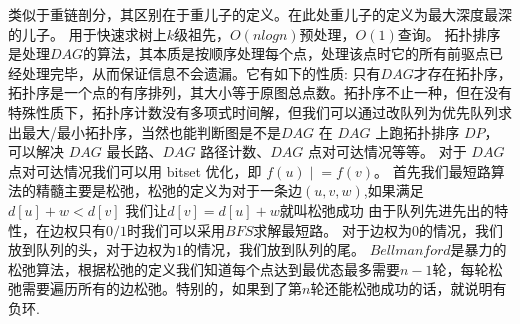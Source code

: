 {}
\markdownRendererSectionEnd \markdownRendererSectionBegin
{}\markdownRendererInterblockSeparator
{}类似于重链剖分，其区别在于重儿子的定义。在此处重儿子的定义为最大深度最深的儿子。\markdownRendererParagraphSeparator
{}用于快速求树上$ k $级祖先，$ O(nlogn) $预处理，$ O(1) $查询。\markdownRendererInterblockSeparator
{}\markdownRendererInterblockSeparator
{}
\markdownRendererSectionEnd 
\markdownRendererSectionEnd \markdownRendererSectionBegin
{}\markdownRendererInterblockSeparator
{}拓扑排序是处理$ DAG $的算法，其本质是按顺序处理每个点，处理该点时它的所有前驱点已经处理完毕，从而保证信息不会遗漏。它有如下的性质:\markdownRendererParagraphSeparator
{}只有$ DAG $才存在拓扑序，拓扑序是一个点的有序排列，其大小等于原图总点数。拓扑序不止一种，但在没有特殊性质下，拓扑序计数没有多项式时间解，但我们可以通过改队列为优先队列求出最大/最小拓扑序，当然也能判断图是不是$ DAG $\markdownRendererParagraphSeparator
{}在 $DAG$ 上跑拓扑排序 $DP$，可以解决 $DAG$ 最长路、$DAG$ 路径计数、$DAG$ 点对可达情况等等。\markdownRendererParagraphSeparator
{}对于 $DAG$ 点对可达情况我们可以用 bitset 优化，即 $f(u) \mathrel{|}= f(v)$。\markdownRendererInterblockSeparator
{}\markdownRendererInterblockSeparator
{}
\markdownRendererSectionEnd \markdownRendererSectionBegin
{}\markdownRendererInterblockSeparator
{}\markdownRendererSectionBegin
{}\markdownRendererInterblockSeparator
{}首先我们最短路算法的精髓主要是松弛，松弛的定义为对于一条边$ (u,v,w) $,如果满足$ d[u]+w<d[v] $\markdownRendererParagraphSeparator
{}我们让$ d[v]=d[u]+w $就叫松弛成功\markdownRendererInterblockSeparator
{}\markdownRendererSectionBegin
{}\markdownRendererInterblockSeparator
{}由于队列先进先出的特性，在边权只有$ 0/1 $时我们可以采用$ BFS $求解最短路。\markdownRendererParagraphSeparator
{}对于边权为$ 0 $的情况，我们放到队列的头，对于边权为$ 1 $的情况，我们放到队列的尾。\markdownRendererInterblockSeparator
{}
\markdownRendererSectionEnd \markdownRendererSectionBegin
{}\markdownRendererInterblockSeparator
{}$ Bellmanford $是暴力的松弛算法，根据松弛的定义我们知道每个点达到最优态最多需要$ n-1 $轮，每轮松弛需要遍历所有的边松弛。特别的，如果到了第$ n $轮还能松弛成功的话，就说明有负环.\markdownRendererParagraphSeparator
